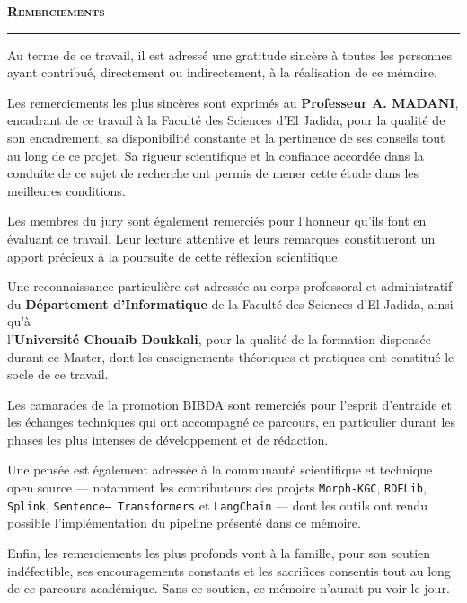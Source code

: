 \clearpage

\begin{center}
    \vspace*{1cm} 
    {\Huge \scshape \color{titleblue} \textbf{Remerciements}} \\[0.2cm]
    \textcolor{bordergreen}{\rule{1cm}{1.2pt}}
    \vspace{1cm} 
\end{center}
\renewcommand{\baselinestretch}{1.15}\normalsize

Au terme de ce travail, il est adressé une gratitude sincère à toutes
les personnes ayant contribué, directement ou indirectement, à la
réalisation de ce mémoire.

Les remerciements les plus sincères sont exprimés au
\textbf{Professeur A. MADANI}, encadrant de ce travail à la Faculté
des Sciences d'El Jadida, pour la qualité de son encadrement, sa
disponibilité constante et la pertinence de ses conseils tout au long
de ce projet. Sa rigueur scientifique et la confiance accordée dans
la conduite de ce sujet de recherche ont permis de mener cette étude
dans les meilleures conditions.

Les membres du jury sont également remerciés pour l'honneur qu'ils
font en évaluant ce travail. Leur lecture attentive et leurs
remarques constitueront un apport précieux à la poursuite de cette
réflexion scientifique.

Une reconnaissance particulière est adressée au corps professoral et
administratif du \textbf{Département d'Informatique} de la Faculté
des Sciences d'El Jadida, ainsi qu'à \\ l'\textbf{Université Chouaib
Doukkali}, pour la qualité de la formation dispensée durant ce
Master, dont les enseignements théoriques et pratiques ont constitué
le socle de ce travail.

Les camarades de la promotion BIBDA sont remerciés pour l'esprit
d'entraide et les échanges techniques qui ont accompagné ce parcours,
en particulier durant les phases les plus intenses de développement
et de rédaction.

Une pensée est également adressée à la communauté scientifique et
technique open source — notamment les contributeurs des projets
\texttt{Morph-KGC}, \texttt{RDFLib}, \texttt{Splink},
\texttt{Sentence-- Transformers} et \texttt{LangChain} — dont les
outils ont rendu possible l'implémentation du pipeline présenté dans
ce mémoire.

Enfin, les remerciements les plus profonds vont à la famille, pour
son soutien indéfectible, ses encouragements constants et les
sacrifices consentis tout au long de ce parcours académique. Sans ce
soutien, ce mémoire n'aurait pu voir le jour.

\newpage